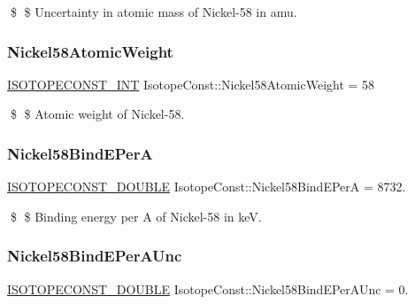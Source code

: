 \$ \$ Uncertainty in atomic mass of Nickel-\/58 in amu. \mbox{\label{group___isotope_const-_nickel-_ni58_ga1da5ab30c23b7f68a1bc71167bc5dde2}} 
\subsubsection{\texorpdfstring{Nickel58\+Atomic\+Weight}{Nickel58AtomicWeight}}
{\footnotesize\ttfamily \mbox{\hyperlink{group___isotope_const-_macros_ga5f18360b3e99483a35c32d789e62621c}{I\+S\+O\+T\+O\+P\+E\+C\+O\+N\+S\+T\+\_\+\+I\+NT}} Isotope\+Const\+::\+Nickel58\+Atomic\+Weight = 58}

\$ \$ Atomic weight of Nickel-\/58. \mbox{\label{group___isotope_const-_nickel-_ni58_ga83b695c22703a64d71ffabe07848b108}} 
\subsubsection{\texorpdfstring{Nickel58\+Bind\+E\+PerA}{Nickel58BindEPerA}}
{\footnotesize\ttfamily \mbox{\hyperlink{group___isotope_const-_macros_ga8f45a7272ce02c0b4c65c44636ed719a}{I\+S\+O\+T\+O\+P\+E\+C\+O\+N\+S\+T\+\_\+\+D\+O\+U\+B\+LE}} Isotope\+Const\+::\+Nickel58\+Bind\+E\+PerA = 8732.}

\$ \$ Binding energy per A of Nickel-\/58 in keV. \mbox{\label{group___isotope_const-_nickel-_ni58_gac84a5c0fa93cfa9afefc6a1526ada0c0}} 
\subsubsection{\texorpdfstring{Nickel58\+Bind\+E\+Per\+A\+Unc}{Nickel58BindEPerAUnc}}
{\footnotesize\ttfamily \mbox{\hyperlink{group___isotope_const-_macros_ga8f45a7272ce02c0b4c65c44636ed719a}{I\+S\+O\+T\+O\+P\+E\+C\+O\+N\+S\+T\+\_\+\+D\+O\+U\+B\+LE}} Isotope\+Const\+::\+Nickel58\+Bind\+E\+Per\+A\+Unc = 0.}

